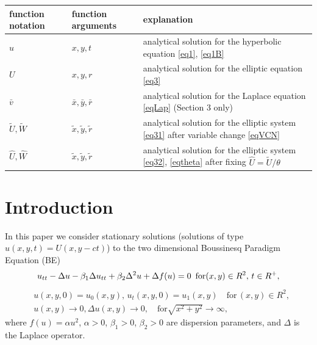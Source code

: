 \documentclass[12pt]{article}
\theoremstyle{theorem}
\theoremstyle{defi}
\begin{document}
\begin{center}
\begin{table}[ht]
		\begin{tabular}{|C{1.6cm}|C{1.9cm}|C{7.3cm}|}
   			\hline
			\hline
    function notation  & function arguments   &  explanation  \\
               	 \hline
    $u$          & $x,y,t$                            &  analytical solution for the hyperbolic equation \eqref{eq1}, \eqref{eq1B} \\
			\hline 	
      $U$        &   $x, y, r$                           & analytical solution for the elliptic equation \eqref{eq3} \\
			\hline 	
      $\bar v$        &  $\bar x, \bar y, \bar r$  & analytical solution for the Laplace equation \eqref{eqLap} (Section 3 only)  \\
			\hline 	
     $\tilde U, \tilde W$ & $ \tilde x, \tilde y, \tilde r$  &  analytical solution for the elliptic system \eqref{eq31} after variable change \eqref{eqVCN} \\
			\hline 	
     $\widehat U, \widehat W$ & $\tilde x, \tilde y, \tilde r$  &  analytical solution for the elliptic system \eqref{eq32}, \eqref{eqtheta} after fixing $ \widehat U = \tilde U / \theta $ \\
		   \hline
	          \hline
		\end{tabular}
\end{table}
\end{center}

\section{Introduction}

In this paper we consider stationary solutions (solutions of type  $u(x,y,t)=U(x,y - ct)$) to the two dimensional Boussinesq Paradigm Equation (BE)
\begin{equation}
u_{tt} - \Delta u -\beta_1  \Delta u_{tt} +\beta_2 \Delta ^2 u + \Delta f(u)=0 \enskip \text{for} (x,y) \in R^2, \, t\in R^+ ,\label{eq1}
\end{equation}
\begin{equation}\label{eq1B}
\begin{split}
&u(x,y,0)=u_0(x,y), \, u_t(x,y,0)=u_1(x,y)   \quad\text{for} \, (x,y) \in R^2, \\
&u(x,y) \rightarrow 0,  \Delta u(x,y) \rightarrow 0 ,  \quad \text{for}  \sqrt{x^2 + y^2} \rightarrow \infty,
\end{split}
\end{equation}
where   $f(u)=\alpha u^2$,  $\alpha>0$, $\beta_1>0$, $\beta_2>0$  are dispersion parameters, and $\Delta$ is the Laplace operator.
\end{document}
